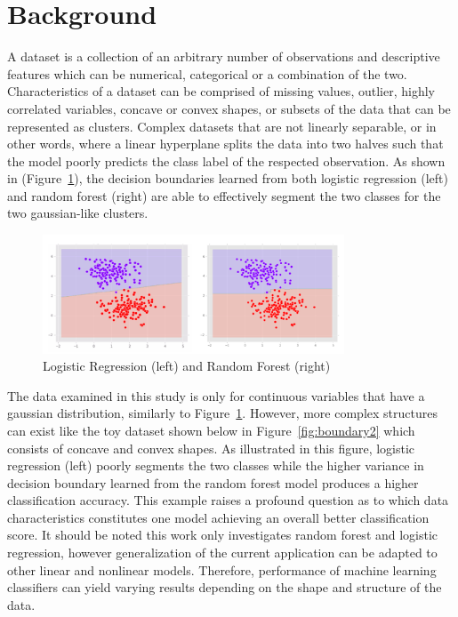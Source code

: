 \documentclass{llncs}
\begin{document}
\section{Background}
\noindent 

A dataset is a collection of an arbitrary number of observations and descriptive features which can be numerical, categorical or a combination of the two. Characteristics of a dataset can be comprised of missing values, outlier, highly correlated variables, concave or convex shapes, or subsets of the data that can be represented as clusters. Complex datasets that are not linearly separable, or in other words, where a linear hyperplane splits the data into two halves such that the model poorly predicts the class label of the respected observation. As shown in (Figure~\ref{fig:boundary1}), the decision boundaries learned from both logistic regression (left) and random forest (right) are able to effectively segment the two classes for the two gaussian-like clusters.

\begin{figure}
\centering
\includegraphics[width=0.8\textwidth]{decisionboundary.png}
\caption{Logistic Regression (left) and Random Forest (right)}
\label{fig:boundary1}
\end{figure}

\noindent 
The data examined in this study is only for continuous variables that have a gaussian distribution, similarly to Figure~\ref{fig:boundary1}. However, more complex structures can exist like the toy dataset shown below in Figure~\ref{fig:boundary2} which consists of concave and convex shapes. As illustrated in this figure, logistic regression (left) poorly segments the two classes while the higher variance in decision boundary learned from the random forest model produces a higher classification accuracy. This example raises a profound question as to which data characteristics constitutes one model achieving an overall better classification score. It should be noted this work only investigates random forest and logistic regression, however generalization of the current application can be adapted to other linear and nonlinear models. Therefore, performance of machine learning classifiers can yield varying results depending on the shape and structure of the data.
\end{document}
